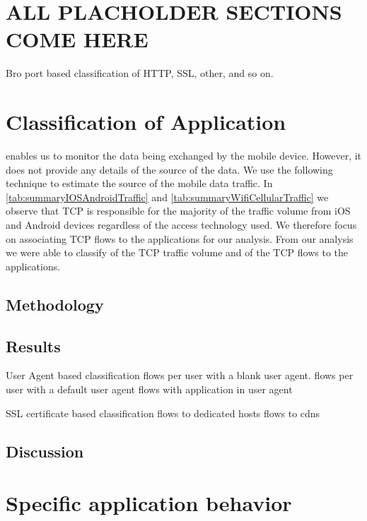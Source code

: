 \section{ALL PLACHOLDER SECTIONS COME HERE}



%





Bro port based classification of HTTP, SSL, other, and so on. 


\section{Classification of Application}

\platname enables us to monitor the data being exchanged by the mobile device. 
However, it does not provide any details of the source of the data. 
We use the following technique to estimate the source of the mobile data traffic. 
In \ref{tab:summaryIOSAndroidTraffic} and \ref{tab:summaryWifiCellularTraffic} we observe that TCP is responsible for the majority of the traffic volume from iOS and Android devices regardless of the access technology used. 
We therefore focus on associating TCP flows to the applications for our analysis. 
From our analysis we were able to classify  of the TCP traffic volume and  of the TCP flows to the applications.

\subsection{Methodology}

\subsection{Results}

User Agent based classification
flows per user with a blank user agent. 
flows per user with a default user agent 
flows with application in user agent


SSL certificate based classification
flows to dedicated hosts
flows to cdns

\subsection{Discussion}

\section{Specific application behavior}


